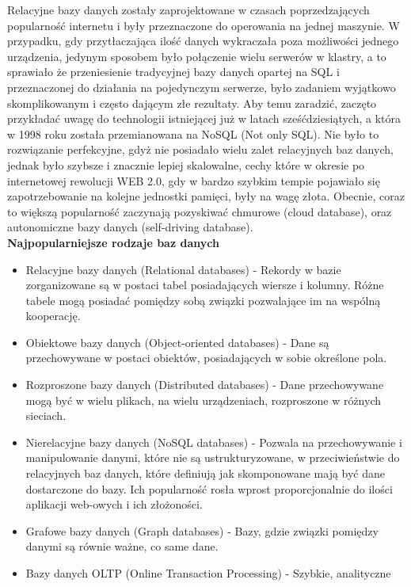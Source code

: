 \documentclass[12pt, a4paper]{article}
\begin{document}
\begin{sloppypar}
{{    Relacyjne bazy danych zostały zaprojektowane w czasach poprzedzających popularność
    internetu i były przeznaczone do operowania na jednej maszynie. W przypadku, gdy
    przytłaczająca ilość danych wykraczała poza możliwości jednego urządzenia, jedynym
    sposobem było połączenie wielu serwerów w klastry, a to sprawiało że przeniesienie
    tradycyjnej bazy danych opartej na SQL i przeznaczonej do działania na pojedynczym
    serwerze, było zadaniem wyjątkowo skomplikowanym i często dającym złe rezultaty.
    Aby temu zaradzić, zaczęto przykładać uwagę do technologii istniejącej już w latach
    sześćdziesiątych, a która w 1998 roku została przemianowana na NoSQL (Not only SQL).
    Nie było to rozwiązanie perfekcyjne, gdyż nie posiadało wielu zalet relacyjnych baz
    danych, jednak było szybsze i znacznie lepiej skalowalne, cechy które w okresie po
    internetowej rewolucji WEB 2.0, gdy w bardzo szybkim tempie pojawiało się zapotrzebowanie
    na kolejne jednostki pamięci, były na wagę złota. Obecnie, coraz to większą popularność
    zaczynają pozyskiwać chmurowe (cloud database), oraz autonomiczne bazy danych
    (self-driving database).\\
    {\large \bfseries Najpopularniejsze rodzaje baz danych} \cite{oracle-db}
    \begin{itemize}
      \item Relacyjne bazy danych (Relational databases) - Rekordy w bazie zorganizowane
      są w postaci tabel posiadających wiersze i kolumny. Różne tabele mogą posiadać
      pomiędzy sobą związki pozwalające im na wspólną kooperację. 
      \item Obiektowe bazy danych (Object-oriented databases) - Dane są przechowywane w
      postaci obiektów, posiadających w sobie określone pola.
      \item Rozproszone bazy danych (Distributed databases) - Dane przechowywane mogą być
      w wielu plikach, na wielu urządzeniach, rozproszone w różnych sieciach.
      \item Nierelacyjne bazy danych (NoSQL databases) - Pozwala na przechowywanie i
      manipulowanie danymi, które nie są ustrukturyzowane, w przeciwieństwie do relacyjnych
      baz danych, które definiują jak skomponowane mają być dane dostarczone do bazy. Ich
      popularność rosła wprost proporcjonalnie do ilości aplikacji web-owych i ich
      złożoności.
      \item Grafowe bazy danych (Graph databases) - Bazy, gdzie związki pomiędzy
      danymi są równie ważne, co same dane.
      \item Bazy danych OLTP (Online Transaction Processing) - Szybkie, analityczne

\end{itemize}}}
\end{sloppypar}
\end{document}
